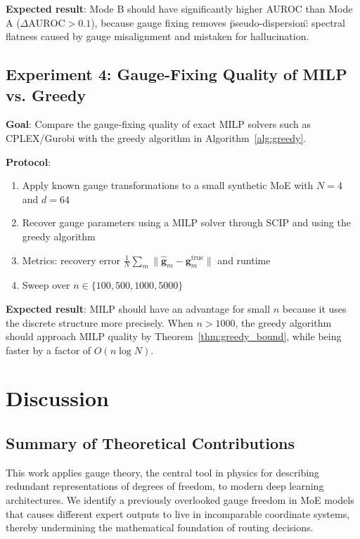 \documentclass[12pt,a4paper]{article}
\theoremstyle{remark}
\begin{document}
\textbf{Expected result}: Mode B should have significantly higher AUROC than Mode A ($\Delta \text{AUROC} > 0.1$), because gauge fixing removes \"pseudo-dispersion\": spectral flatness caused by gauge misalignment and mistaken for hallucination.

\subsection{Experiment 4: Gauge-Fixing Quality of MILP vs. Greedy}

\textbf{Goal}: Compare the gauge-fixing quality of exact MILP solvers such as CPLEX/Gurobi with the greedy algorithm in Algorithm~\ref{alg:greedy}.

\textbf{Protocol}:
\begin{enumerate}
    \item Apply known gauge transformations to a small synthetic MoE with $N=4$ and $d=64$
    \item Recover gauge parameters using a MILP solver through SCIP and using the greedy algorithm
    \item Metrics: recovery error $\frac{1}{N}\sum_m \|\hat{\mathbf{g}}_m - \mathbf{g}_m^{\text{true}}\|$ and runtime
    \item Sweep over $n \in \{100, 500, 1000, 5000\}$
\end{enumerate}

\textbf{Expected result}: MILP should have an advantage for small $n$ because it uses the discrete structure more precisely. When $n > 1000$, the greedy algorithm should approach MILP quality by Theorem~\ref{thm:greedy_bound}, while being faster by a factor of $O(n \log N)$.

\section{Discussion}

\subsection{Summary of Theoretical Contributions}

This work applies gauge theory, the central tool in physics for describing redundant representations of degrees of freedom, to modern deep learning architectures. We identify a previously overlooked gauge freedom in MoE models that causes different expert outputs to live in incomparable coordinate systems, thereby undermining the mathematical foundation of routing decisions.
\end{document}
